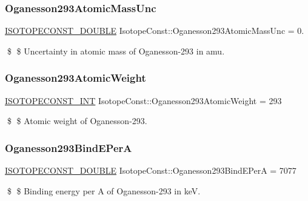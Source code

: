 \subsubsection{\texorpdfstring{Oganesson293\+Atomic\+Mass\+Unc}{Oganesson293AtomicMassUnc}}
{\footnotesize\ttfamily \mbox{\hyperlink{group___isotope_const-_macros_ga8f45a7272ce02c0b4c65c44636ed719a}{I\+S\+O\+T\+O\+P\+E\+C\+O\+N\+S\+T\+\_\+\+D\+O\+U\+B\+LE}} Isotope\+Const\+::\+Oganesson293\+Atomic\+Mass\+Unc = 0.}

\$ \$ Uncertainty in atomic mass of Oganesson-\/293 in amu. \mbox{\label{group___isotope_const-_oganesson-_og293_gabca899f36ee47f8f37a98065c55bfea8}} 
\subsubsection{\texorpdfstring{Oganesson293\+Atomic\+Weight}{Oganesson293AtomicWeight}}
{\footnotesize\ttfamily \mbox{\hyperlink{group___isotope_const-_macros_ga5f18360b3e99483a35c32d789e62621c}{I\+S\+O\+T\+O\+P\+E\+C\+O\+N\+S\+T\+\_\+\+I\+NT}} Isotope\+Const\+::\+Oganesson293\+Atomic\+Weight = 293}

\$ \$ Atomic weight of Oganesson-\/293. \mbox{\label{group___isotope_const-_oganesson-_og293_ga77d9449d3905aae00bfd87be527c7090}} 
\subsubsection{\texorpdfstring{Oganesson293\+Bind\+E\+PerA}{Oganesson293BindEPerA}}
{\footnotesize\ttfamily \mbox{\hyperlink{group___isotope_const-_macros_ga8f45a7272ce02c0b4c65c44636ed719a}{I\+S\+O\+T\+O\+P\+E\+C\+O\+N\+S\+T\+\_\+\+D\+O\+U\+B\+LE}} Isotope\+Const\+::\+Oganesson293\+Bind\+E\+PerA = 7077}

\$ \$ Binding energy per A of Oganesson-\/293 in keV. \mbox{\label{group___isotope_const-_oganesson-_og293_ga229aea630fb1e003554ce542f20b1d3d}} 
